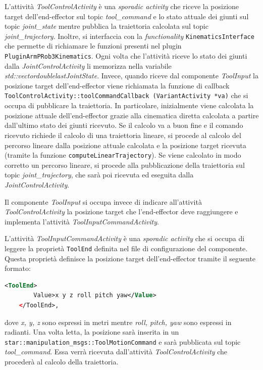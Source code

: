 L'attività \textit{ToolControlActivity} è una \textit{sporadic activity} che riceve la posizione target dell'end-effector sul topic \textit{tool\_command} e lo stato attuale dei giunti sul topic \textit{joint\_state} mentre pubblica la traiettoria calcolata sul topic \textit{joint\_trajectory}. Inoltre, si interfaccia con la \textit{functionality} \texttt{KinematicsInterface} che permette di richiamare le funzioni presenti nel plugin \texttt{PluginArmPRob3Kinematics}. Ogni volta che l'attività riceve lo stato dei giunti dalla \textit{JointControlActivity} li memorizza nella variabile \textit{std::vector\tl double\tr lastJointState}. Invece, quando riceve dal componente \textit{ToolInput} la posizione target dell'end-effector viene richiamata la funzione di callback \texttt{ToolControlActivity::toolCommandCallback (VariantActivity *va)} che si occupa di pubblicare la traiettoria. In particolare, inizialmente viene calcolata la posizione attuale dell'end-effector grazie alla cinematica diretta calcolata a partire dall'ultimo stato dei giunti ricevuto. Se il calcolo va a buon fine e il comando ricevuto richiede il calcolo di una traiettoria lineare, si procede al calcolo del percorso lineare dalla posizione attuale calcolata e la posizione target ricevuta (tramite la funzione \texttt{computeLinearTrajectory}). Se viene calcolato in modo corretto un percorso lineare, si procede alla pubblicazione della traiettoria sul topic \textit{joint\_trajectory}, che sarà poi ricevuta ed eseguita dalla \textit{JointControlActivity}.

Il componente \textit{ToolInput} si occupa invece di indicare all'attività \textit{ToolControlActivity} la posizione target che l'end-effector deve raggiungere e implementa l'attività \textit{ToolInputCommandActivity}.

L'attività \textit{ToolInputCommandActivity} è una \textit{sporadic activity} che si occupa di leggere la proprietà \texttt{ToolEnd} definita nel file di configurazione del componente. Questa proprietà definisce la posizione target dell'end-effector tramite il seguente formato:
\begin{lstlisting}[language=xml]
	<ToolEnd>
		Value>x y z roll pitch yaw</Value>
	</ToolEnd>,
\end{lstlisting}
dove \textit{x, y, z} sono espressi in metri mentre \textit{roll, pitch, yaw} sono espressi in radianti. Una volta letta, la posizione sarà inserita in un \texttt{star::manipulation\_msgs::ToolMotionCommand} e sarà pubblicata sul topic \textit{tool\_command}. Essa verrà ricevuta dall'attività \textit{ToolControlActivity} che procederà al calcolo della traiettoria.
